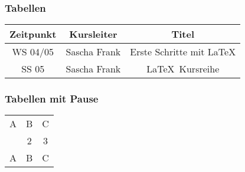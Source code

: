 \documentclass{beamer}
\begin{document}

\begin{frame}\frametitle{Tabellen}
\begin{tabular}{|c|c|c|}
\hline
\textbf{Zeitpunkt} & \textbf{Kursleiter} & \textbf{Titel} \\
\hline
WS 04/05 & Sascha Frank &  Erste Schritte mit \LaTeX  \\
\hline
SS 05 & Sascha Frank & \LaTeX \ Kursreihe \\
\hline
\end{tabular}
\end{frame}


\begin{frame}\frametitle{Tabellen mit Pause}
\begin{tabular}{c c c}
A & B & C \\ 
\pause 
1 & 2 & 3 \\  
\pause 
A & B & C \\ 
\end{tabular} 
\end{frame}
\end{document}
